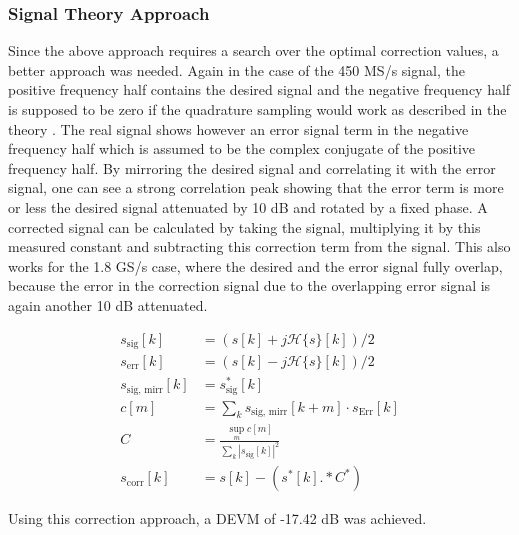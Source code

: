\subsubsection{Signal Theory Approach}
Since the above approach requires a search over the optimal correction values,
a better approach was needed. Again in the case of the 450 MS/s signal,
the positive frequency half contains the desired signal and the negative frequency
half is supposed to be zero if the quadrature sampling would work as described
in the theory . The real signal shows however an error
signal term in the negative frequency half which is assumed to be the
complex conjugate of the positive frequency half. By mirroring the desired signal
and correlating it with the error signal, one can see a strong
correlation peak showing that the error term is more or less the
desired signal attenuated by 10 dB and rotated by a fixed phase.
A corrected signal can be calculated by taking the signal, multiplying
it by this measured constant and subtracting this correction term
from the signal. This also works for the 1.8 GS/s case, where the desired
and the error signal fully overlap, because the error in the correction signal
due to the overlapping error signal is again another 10 dB attenuated.

\begin{align}
  s_{\text{sig}}[k] &= (s[k] + j \mathcal{H}\{s\}[k])/2 \\
  s_{\text{err}}[k] &= (s[k] - j \mathcal{H}\{s\}[k])/2 \\
  s_{\text{sig, mirr}}[k] &= s_{\text{sig}}^*[k] \\
  c[m] &= \sum_k s_{\text{sig, mirr}}[k+m] \cdot s_{\text{Err}}[k] \\
  C &= \frac{\sup_m c[m]}{\sum_k |s_{\text{sig}}[k]|^2} \\
  s_{\text{corr}}[k] &= s[k] - (s^*[k] .* C^*)
\end{align}

Using this correction approach, a \gls{DEVM} of -17.42 dB was achieved.

